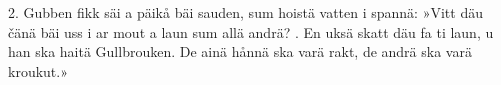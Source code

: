 \begin{multicols}{2}
2.  Gubben fikk säi a päikå bäi sauden,
    sum hoistä vatten i spannä:
    »Vitt däu čänä bäi uss i ar
    mout a laun sum allä andrä?
\vfill{}.  En uksä skatt däu fa ti laun,
    u han ska haitä Gullbrouken.
    De ainä hånnä ska varä rakt,
    de andrä ska varä kroukut.»
\end{multicols}
